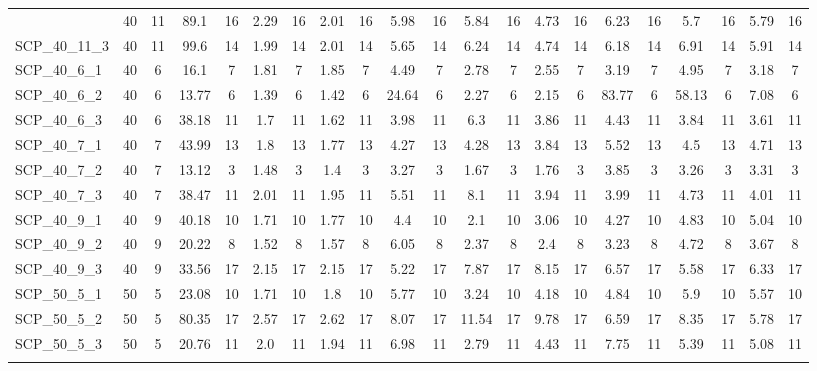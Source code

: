 \begin{sidewaystable}[!ht]
{\begin{tabular}{lcccccccccccccccccccc}
{SCP\_40\_11\_2 & 40 & 11 & 89.1 & 16 & 2.29 & 16 &  \textcolor{blue2}{2.01} & 16 & 5.98 & 16 & 5.84 & 16 & 4.73 & 16 & 6.23 & 16 & 5.7 & 16 & 5.79 & 16 \\
SCP\_40\_11\_3 & 40 & 11 & 99.6 & 14 &  \textcolor{blue2}{1.99} & 14 & 2.01 & 14 & 5.65 & 14 & 6.24 & 14 & 4.74 & 14 & 6.18 & 14 & 6.91 & 14 & 5.91 & 14 \\
SCP\_40\_6\_1 & 40 & 6 & 16.1 & 7 &  \textcolor{blue2}{1.81} & 7 & 1.85 & 7 & 4.49 & 7 & 2.78 & 7 & 2.55 & 7 & 3.19 & 7 & 4.95 & 7 & 3.18 & 7 \\
SCP\_40\_6\_2 & 40 & 6 & 13.77 & 6 &  \textcolor{blue2}{1.39} & 6 & 1.42 & 6 & 24.64 & 6 & 2.27 & 6 & 2.15 & 6 & 83.77 & 6 & 58.13 & 6 & 7.08 & 6 \\
SCP\_40\_6\_3 & 40 & 6 & 38.18 & 11 & 1.7 & 11 &  \textcolor{blue2}{1.62} & 11 & 3.98 & 11 & 6.3 & 11 & 3.86 & 11 & 4.43 & 11 & 3.84 & 11 & 3.61 & 11 \\
SCP\_40\_7\_1 & 40 & 7 & 43.99 & 13 & 1.8 & 13 &  \textcolor{blue2}{1.77} & 13 & 4.27 & 13 & 4.28 & 13 & 3.84 & 13 & 5.52 & 13 & 4.5 & 13 & 4.71 & 13 \\
SCP\_40\_7\_2 & 40 & 7 & 13.12 & 3 & 1.48 & 3 &  \textcolor{blue2}{1.4} & 3 & 3.27 & 3 & 1.67 & 3 & 1.76 & 3 & 3.85 & 3 & 3.26 & 3 & 3.31 & 3 \\
SCP\_40\_7\_3 & 40 & 7 & 38.47 & 11 & 2.01 & 11 &  \textcolor{blue2}{1.95} & 11 & 5.51 & 11 & 8.1 & 11 & 3.94 & 11 & 3.99 & 11 & 4.73 & 11 & 4.01 & 11 \\
SCP\_40\_9\_1 & 40 & 9 & 40.18 & 10 &  \textcolor{blue2}{1.71} & 10 & 1.77 & 10 & 4.4 & 10 & 2.1 & 10 & 3.06 & 10 & 4.27 & 10 & 4.83 & 10 & 5.04 & 10 \\
SCP\_40\_9\_2 & 40 & 9 & 20.22 & 8 &  \textcolor{blue2}{1.52} & 8 & 1.57 & 8 & 6.05 & 8 & 2.37 & 8 & 2.4 & 8 & 3.23 & 8 & 4.72 & 8 & 3.67 & 8 \\
SCP\_40\_9\_3 & 40 & 9 & 33.56 & 17 &  \textcolor{blue2}{2.15} & 17 &  \textcolor{blue2}{2.15} & 17 & 5.22 & 17 & 7.87 & 17 & 8.15 & 17 & 6.57 & 17 & 5.58 & 17 & 6.33 & 17 \\
SCP\_50\_5\_1 & 50 & 5 & 23.08 & 10 &  \textcolor{blue2}{1.71} & 10 & 1.8 & 10 & 5.77 & 10 & 3.24 & 10 & 4.18 & 10 & 4.84 & 10 & 5.9 & 10 & 5.57 & 10 \\
SCP\_50\_5\_2 & 50 & 5 & 80.35 & 17 &  \textcolor{blue2}{2.57} & 17 & 2.62 & 17 & 8.07 & 17 & 11.54 & 17 & 9.78 & 17 & 6.59 & 17 & 8.35 & 17 & 5.78 & 17 \\
SCP\_50\_5\_3 & 50 & 5 & 20.76 & 11 & 2.0 & 11 &  \textcolor{blue2}{1.94} & 11 & 6.98 & 11 & 2.79 & 11 & 4.43 & 11 & 7.75 & 11 & 5.39 & 11 & 5.08 & 11 \\
}
\end{tabular}}
\end{sidewaystable}
